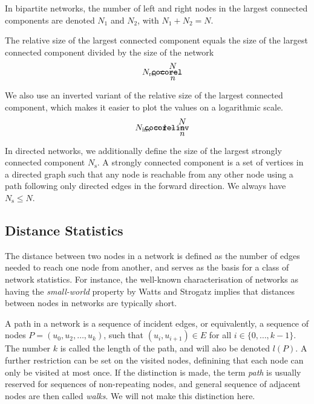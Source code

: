 \documentclass{article}
\def\mathnote#1{%
  \tag*{\rlap{\hspace\marginparsep\smash{\parbox[t]{\marginparwidth}{#1}}}}
}
\begin{document}
In bipartite networks, the number of left and right nodes in the largest
connected components are denoted $N_1$ and $N_2$,
with $N_1 + N_2 = N$. 

The relative size of the largest connected component equals the
size of the largest connected component divided by the size of the
network
\begin{align}
  \mathnote{\texttt{cocorel}}
  N_{\mathrm{rel}} &= \frac N n. 
\end{align}

We also use an inverted variant of the relative size of the largest
connected component, which makes it easier to plot the values on a
logarithmic scale.
\begin{align}
  \mathnote{\texttt{cocorelinv}}
  N_{\mathrm{inv}} &= 1 - \frac N n 
\end{align}

In directed networks, we additionally define the size of the largest
strongly connected component $N_{\mathrm s}$.  A strongly
connected component is a 
set of vertices in a directed graph such that any node is reachable from
any other node using a path following only directed edges in the forward
direction.   We always have $N_{\mathrm s} \leq N$. 

\subsection{Distance Statistics}
\label{sec:distance-statistics}
The distance between two nodes in a network is defined as the number of
edges needed to reach one node from another, and serves as the basis for
a class of network statistics.
For instance, the well-known characterisation of networks as having the
\emph{small-world} property by Watts and Strogatz \citeyearpar{b228}
implies that distances between nodes in networks are typically short. 

A path in a network is a sequence of incident edges, or equivalently, a
sequence of nodes $P = (u_0, u_2, \dotsc, u_k)$, such that $(u_i,
u_{i+1})\in E$ for all $i \in \{0, \dotsc, k-1\}$.  The number $k$ is
called the length of the path, and will also be denoted $l(P)$.  A
further restriction can be set on the visited nodes, definining that
each node can only be visited at most once. If the distinction is made,
the term \emph{path} is usually reserved for sequences of non-repeating
nodes, and general sequence of adjacent nodes are then called
\emph{walks}.  We will not make this distinction here.
\end{document}
